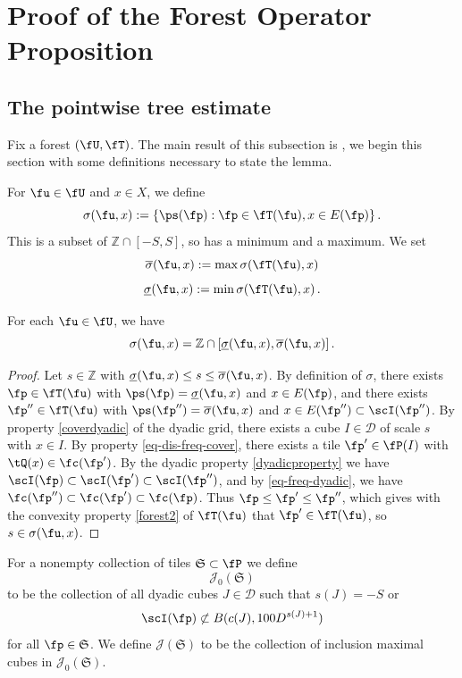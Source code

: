\chapter{Proof of the Forest Operator Proposition}

\label{treesection}

\section{The pointwise tree estimate}
Fix a forest $(\fU, \fT)$. The main result of this subsection is , we begin this section with some definitions necessary to state the lemma.

For $\fu \in \fU$ and $x\in X$, we define
$$
    \sigma (\fu, x):=\{\ps(\fp):\fp\in \fT(\fu), x\in E(\fp)\}\,.
$$
This is a subset of $\mathbb{Z} \cap [-S, S]$, so has a minimum and a maximum. We set
$$
    \overline{\sigma} (\fu, x) := \max \sigma(\fT(\fu), x)
$$
$$
    \underline{\sigma} (\fu, x) := \min\sigma(\fT(\fu), x)\,.
$$
\begin{lemma}
\label{convex-scales}
\leanok
{}
    For each $\fu \in \fU$, we have
    $$
        \sigma(\fu, x) = \mathbb{Z} \cap [\underline{\sigma} (\fu, x), \overline{\sigma} (\fu, x)]\,.
    $$
\end{lemma}

\begin{proof}
    \leanok
    Let $s \in \mathbb{Z}$ with $\underline{\sigma} (\fu, x) \le s \le \overline{\sigma} (\fu, x)$. By definition of $\sigma$, there exists $\fp \in \fT(\fu)$ with $\ps(\fp) = \underline{\sigma} (\fu, x)$ and $x \in E(\fp)$, and there exists $\fp'' \in \fT(\fu)$ with $\ps(\fp'') = \overline{\sigma} (\fu, x)$ and $x \in E(\fp'') \subset \scI(\fp'')$. By property \eqref{coverdyadic} of the dyadic grid, there exists a cube $I \in \mathcal{D}$ of scale $s$ with $x \in I$. By property \eqref{eq-dis-freq-cover}, there exists a tile $\fp' \in \fP(I)$ with $\tQ(x) \in \fc(\fp')$. By the dyadic property \eqref{dyadicproperty} we have $\scI(\fp) \subset \scI(\fp') \subset \scI(\fp'')$, and by \eqref{eq-freq-dyadic}, we have $\fc(\fp'') \subset \fc(\fp') \subset \fc(\fp)$. Thus $\fp \le \fp' \le\fp''$, which gives with the convexity property \eqref{forest2} of $\fT(\fu)$ that $\fp' \in \fT(\fu)$, so $s \in \sigma(\fu, x)$.
\end{proof}

For a nonempty collection of tiles $\mathfrak{S} \subset \fP$ we define
$$
    \mathcal{J}_0(\mathfrak{S})
$$
to be the collection of all dyadic cubes $J \in \mathcal{D}$ such that $s(J) = -S$ or
$$
    \scI(\fp) \not\subset B(c(J), 100D^{s(J) + 1})
$$
for all $\fp \in \mathfrak{S}$. We define $\mathcal{J}(\mathfrak{S})$ to be the collection of inclusion maximal cubes in $\mathcal{J}_0(\mathfrak{S})$.

